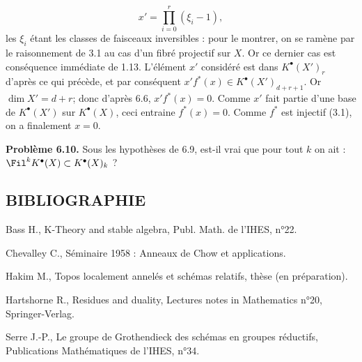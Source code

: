 
\[
  x'=\prod_{i=0}^{r}(\xi_i-1),
\]
les $\xi_i$
étant les classes de faisceaux inversibles : pour le montrer, on se ramène par le raisonnement de 3.1 au cas d'un fibré projectif sur $X$. Or ce dernier cas est conséquence immédiate de 1.13. L'élément $x'$ considéré est dans $K^{\bullet}(X')_r$ d'après ce qui précède, et par conséquent $x'f^*(x)\in K^{\bullet}(X')_{d+r+1}$. Or $\dim X'=d+r$; donc d'après 6.6, $x'f^*(x)=0$. Comme $x'$ fait partie d'une base de $K^{\bullet}(X')$ sur $K^{\bullet}(X)$, ceci entraine $f^*(x)=0$. Comme $f^*$ est injectif (3.1), on a finalement $x=0$.

\textbf{Problème 6.10.} Sous les hypothèses de 6.9, est-il vrai que pour tout $k$ on ait : $\Fil^kK^{\bullet}(X)\subset K^{\bullet}(X)_k$ ?

\subsection*{BIBLIOGRAPHIE}
\begin{enumerate}[label={\textup{[\arabic*]}}]
\item Bass H., K-Theory and stable algebra, Publ. Math. de l'IHES, n°22.
\item Chevalley C., Séminaire 1958 : Anneaux de Chow et applications.
\item Hakim M., Topos localement annelés et schémas relatifs, thèse (en préparation).
\item Hartshorne R., Residues and duality, Lectures notes in Mathematics n°20, Springer-Verlag.
\item Serre J.-P., Le groupe de Grothendieck des schémas en groupes réductifs, Publications Mathématiques de l'IHES, n°34.
\end{enumerate}



\providecommand{\Kosz}{\mathrm K}
\providecommand{\Proj}{\operatorname{Proj}}
\providecommand{\Sym}{\operatorname{Sym}}
\providecommand{\gr}{\operatorname{gr}}
\providecommand{\Tor}{\operatorname{Tor}}
\providecommand{\Spec}{\operatorname{Spec}}
\providecommand{\Imf}{\operatorname{Im}}
\providecommand{\Ker}{\operatorname{Ker}}
\providecommand{\Id}{\operatorname{Id}}
\providecommand{\rad}{\operatorname{rad}}
\providecommand{\cO}{\mathcal O}
\providecommand{\cS}{\mathcal S}
\providecommand{\cJ}{\mathcal J}
\providecommand{\cN}{\mathcal N}
\providecommand{\bfP}{\mathbf P}
\providecommand{\bfA}{\mathbf A}


